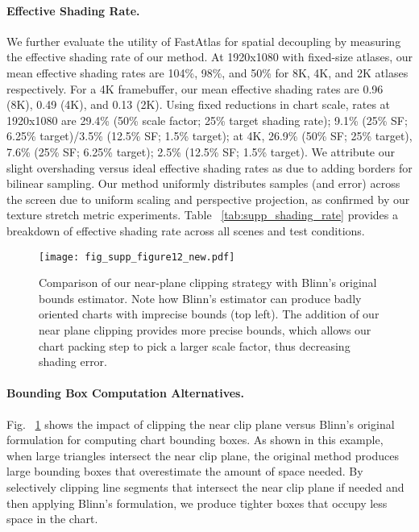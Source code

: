 \paragraph*{Effective Shading Rate.} We further evaluate the utility of FastAtlas for spatial decoupling by measuring the effective shading rate of our method. At 1920x1080 with fixed-size atlases, our mean effective shading rates are 104\%, 98\%, and 50\% for 8K, 4K, and 2K atlases respectively. For a 4K framebuffer, our mean effective shading rates are 0.96 (8K), 0.49 (4K), and 0.13 (2K). Using fixed reductions in chart scale, rates at 1920x1080 are 29.4\% (50\% scale factor; 25\% target shading rate); 9.1\% (25\% SF; 6.25\% target)/3.5\% (12.5\% SF; 1.5\% target); at 4K, 26.9\% (50\% SF; 25\% target), 7.6\% (25\% SF; 6.25\% target); 2.5\% (12.5\% SF; 1.5\% target). We attribute our slight overshading versus ideal effective shading rates as due to adding borders for bilinear sampling. Our method uniformly distributes samples (and error) across the screen due to uniform scaling and perspective projection, as confirmed by our texture stretch metric experiments. Table ~\ref{tab:supp_shading_rate} provides a breakdown of effective shading rate across all scenes and test conditions.

\begin{figure}
    \texttt{[image: fig\_supp\_figure12\_new.pdf]}
    \caption{Comparison of our near-plane clipping strategy with Blinn's original bounds estimator. Note how Blinn's estimator can produce badly oriented charts with imprecise bounds (top left).
    The addition of our near plane clipping provides more precise bounds, which allows our chart packing step to pick a larger scale factor, thus decreasing shading error.} 
    \label{fig:bbox_clip_alt}
\end{figure}

\paragraph{Bounding Box Computation Alternatives.}
\label{app:bbox_near_clip}
Fig. ~\ref{fig:bbox_clip_alt} shows the impact of clipping the near clip plane versus Blinn's original formulation for computing chart bounding boxes. As shown in this example, when large triangles intersect the near clip plane, the original method produces large bounding boxes that overestimate the amount of space needed. By selectively clipping line segments that intersect the near clip plane if needed and then applying Blinn's formulation, we produce tighter boxes that occupy less space in the chart. 

